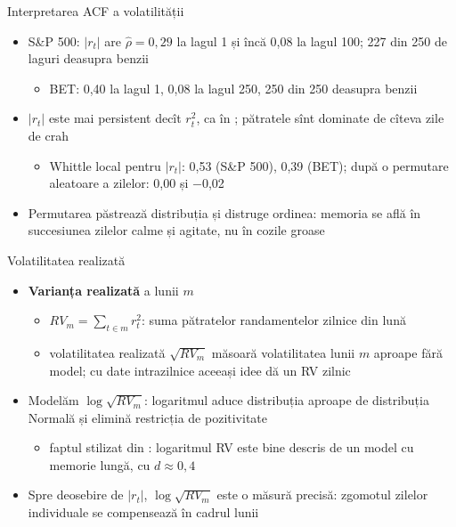 \begin{frame}{Interpretarea ACF a volatilității}
\itemsize{\small}
\begin{itemize}
    \item S\&P 500: $|r_t|$ are $\hat\rho = 0{,}29$ la lagul 1 și încă 0{,}08 la lagul 100; 227 din 250 de laguri deasupra benzii
    \begin{itemize}
        \item BET: 0{,}40 la lagul 1, 0{,}08 la lagul 250, 250 din 250 deasupra benzii
    \end{itemize}
    \item $|r_t|$ este mai persistent decît $r_t^2$, ca în ; pătratele sînt dominate de cîteva zile de crah
    \begin{itemize}
        \item Whittle local pentru $|r_t|$: 0{,}53 (S\&P 500), 0{,}39 (BET); după o permutare aleatoare a zilelor: 0{,}00 și $-$0{,}02
    \end{itemize}
    \item Permutarea păstrează distribuția și distruge ordinea: memoria se află în succesiunea zilelor calme și agitate, nu în cozile groase
\end{itemize}
\end{frame}

\begin{frame}{Volatilitatea realizată}
\itemsize{\small}
\begin{itemize}
    \item \textbf{Varianța realizată} a lunii $m$ 
    \begin{itemize}
        \item $RV_m = \sum_{t \in m} r_t^2$: suma pătratelor randamentelor zilnice din lună
        \item volatilitatea realizată $\sqrt{RV_m}$ măsoară volatilitatea lunii $m$ aproape fără model; cu date intrazilnice aceeași idee dă un RV zilnic
    \end{itemize}
    \item Modelăm $\log\sqrt{RV_m}$: logaritmul aduce distribuția aproape de distribuția Normală și elimină restricția de pozitivitate
    \begin{itemize}
        \item faptul stilizat din : logaritmul RV este bine descris de un model cu memorie lungă, cu $d \approx 0{,}4$
    \end{itemize}
    \item Spre deosebire de $|r_t|$, $\log\sqrt{RV_m}$ este o măsură precisă: zgomotul zilelor individuale se compensează în cadrul lunii
\end{itemize}
\end{frame}

